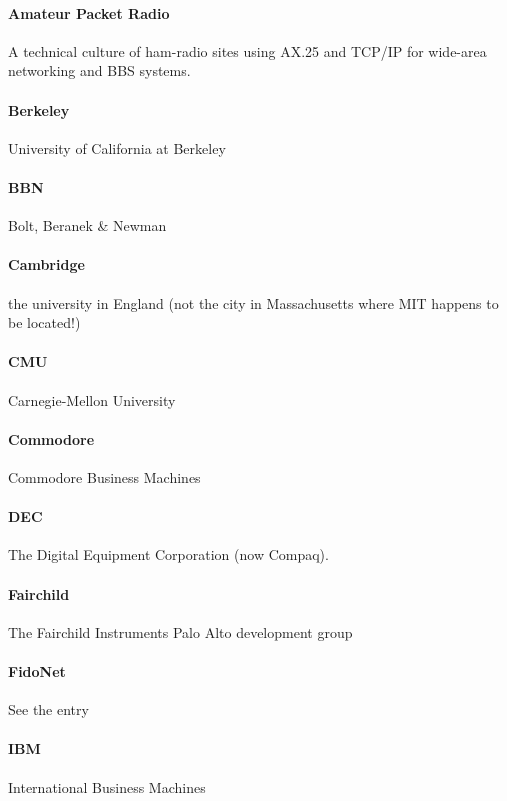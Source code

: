 \begin{multicols}{2}
	\paragraph{Amateur Packet Radio} A technical culture of ham-radio sites using AX.25 and TCP/IP for wide-area networking and BBS systems.

	\paragraph{Berkeley} University of California at Berkeley

	\paragraph{BBN} Bolt, Beranek \& Newman

	\paragraph{Cambridge} the university in England (not the city in Massachusetts where MIT happens to be located!)

	\paragraph{CMU} Carnegie-Mellon University

	\paragraph{Commodore} Commodore Business Machines

	\paragraph{DEC} The Digital Equipment Corporation (now Compaq).

	\paragraph{Fairchild} The Fairchild Instruments Palo Alto development group

	\paragraph{FidoNet} See the  entry

	\paragraph{IBM} International Business Machines


\end{multicols}
